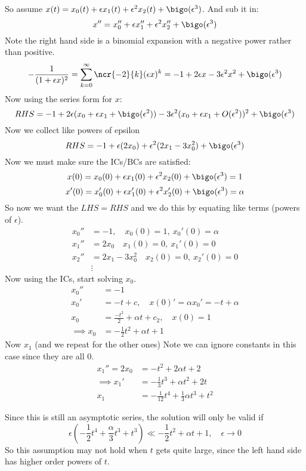 \documentclass{/home/janmebows/Documents/LatexTemplates/myassignment}
\begin{document}
So assume $x(t) = x_0(t) + \epsilon x_1(t) + \epsilon^2 x_2(t) + \bigo(\epsilon^3)$. And sub it in:
\[x'' = x_0'' +\epsilon x_1'' + \epsilon^2 x_2 '' +\bigo(\epsilon^3)\]
Note the right hand side is a binomial expansion with a negative power rather than positive.
\[-\frac{1}{(1+\epsilon x)^2} = \sum_{k=0}^\infty\ncr{-2}{k} (\epsilon x)^k = -1 + 2\epsilon x - 3\epsilon^2 x^2 + \bigo(\epsilon^3)\]
Now using the series form for $x$:
\[RHS = -1 + 2\epsilon(x_0 + \epsilon x_1 + \bigo(\epsilon^2)) - 3\epsilon^2(x_0 + \epsilon x_1 + O(\epsilon^2))^2 + \bigo(\epsilon^3)\]
Now we collect like powers of epsilon
\[RHS = -1 + \epsilon(2x_0) + \epsilon^2(2x_1 -3 x_0^2 ) + \bigo(\epsilon^3)\]
Now we must make sure the ICs/BCs are satisfied:
\[x(0) = x_0(0) + \epsilon x_1(0) + \epsilon^2 x_2 (0) +\bigo(\epsilon^3) = 1\]
\[x'(0) = x_0'(0) + \epsilon x_1'(0) + \epsilon^2 x_2' (0) +\bigo(\epsilon^3) = \alpha\]
So now we want the $LHS = RHS$ and we do this by equating like terms (powers of $\epsilon$).
\begin{align*}
    x_0'' &= -1, \quad x_0(0) = 1, \ x_0'(0) = \alpha\\
    x_1'' &= 2x_0\quad x_1(0) = 0, \ x_1'(0) = 0\\
    x_2'' &= 2x_1 - 3x_0^2\quad x_2(0) = 0, \ x_2'(0) = 0\\
    &\vdots
\end{align*}
Now using the ICs, start solving $x_0$.
\begin{align*}
    x_0'' &= -1\\
    x_0' &= -t + c,\quad x(0)'= \alpha  x_0' =-t+ \alpha\\
    x_0 &= \frac{-t^2}{2} + \alpha t + c_2, \quad x(0) = 1\\
    \implies x_0 &= -\frac12 t^2 + \alpha t +1
\end{align*}
Now $x_1$ (and we repeat for the other ones) 
Note we can ignore constants in this case since they are all $0$.
\begin{align*}
    x_1'' = 2x_0 &= -t^2 + 2\alpha t + 2\\
    \implies x_1' &= -\frac13 t^3 + \alpha t^2 + 2t\\
    x_1 &= -\frac1{12} t^4 + \frac{1}{3} \alpha t^3 + t^2
\end{align*}

Since this is still an asymptotic series, the solution will only be valid if
\[\epsilon(-\frac12 t^4 + \frac{\alpha}{3} t^3 + t^3) \ll -\frac12 t^2 + \alpha t + 1, \quad \epsilon\to 0\]
So this assumption may not hold when $t$ gets quite large, since the left hand side has higher order powers of $t$.
\end{document}
